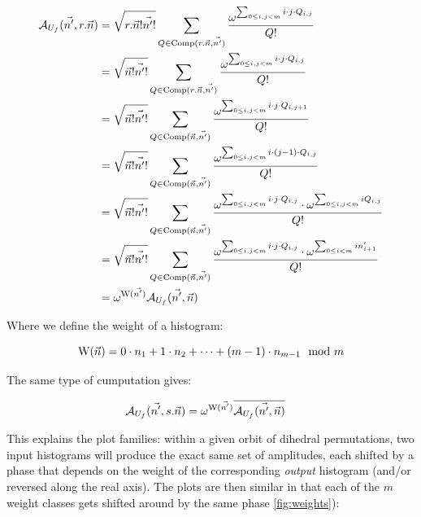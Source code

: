 \begin{align*}
   \mathcal{A}_{U_{f}}(\vec{n'}, r.\vec{n}) &=  \sqrt{r.\vec{n}! \vec{n'}!} \sum_{Q \in \operatorname{Comp}(r.\vec{n}, \vec{n'})} \frac{\omega^{\sum_{0 \leq  i,j < m} i \cdot j \cdot Q_{i,j}}}{Q!}\\
  &= \sqrt{\vec{n}! \vec{n'}!} \sum_{Q \in \operatorname{Comp}(r.\vec{n}, \vec{n'})} \frac{\omega^{\sum_{0 \leq  i,j < m} i \cdot j \cdot Q_{i,j}}}{Q!}\\
  &= \sqrt{\vec{n}! \vec{n'}!} \sum_{Q \in \operatorname{Comp}(\vec{n}, \vec{n'})} \frac{\omega^{\sum_{0 \leq  i,j < m} i \cdot j \cdot Q_{i,j+1}}}{Q!}\\
  &= \sqrt{\vec{n}! \vec{n'}!} \sum_{Q \in \operatorname{Comp}(\vec{n}, \vec{n'})} \frac{\omega^{\sum_{0 \leq  i,j < m} i \cdot (j-1) \cdot Q_{i,j}}}{Q!}\\
  &= \sqrt{\vec{n}! \vec{n'}!} \sum_{Q \in \operatorname{Comp}(\vec{n}, \vec{n'})} \frac{\omega^{\sum_{0 \leq  i,j < m} i \cdot j \cdot Q_{i,j}}\cdot \omega^{\sum_{0 \leq i,j < m} i Q_{i,j}}}{Q!}\\
  &= \sqrt{\vec{n}! \vec{n'}!} \sum_{Q \in \operatorname{Comp}(\vec{n}, \vec{n'})} \frac{\omega^{\sum_{0 \leq  i,j < m} i \cdot j \cdot Q_{i,j}}\cdot \omega^{\sum_{0 \leq i < m} i n'_{i+1}}}{Q!}\\
  &= \omega^{\operatorname{W}(\vec{n'})} \mathcal{A}_{U_{f}}(\vec{n'}, \vec{n})
\end{align*}

Where we define the weight of a histogram:

\[\operatorname{W}(\vec{n}) = 0 \cdot n_{1} + 1 \cdot n_{2} + \cdots + (m-1) \cdot n_{m-1} \mod m \]

The same type of cumputation gives:

\begin{align*}
  \mathcal{A}_{U_{f}}(\vec{n'}, s.\vec{n})   &= \omega^{\operatorname{W}(\vec{n'})} \overline{\mathcal{A}_{U_{f}}(\vec{n'}, \vec{n})}
\end{align*}

This explains the plot families: within a given orbit of dihedral permutations, two input histograms will produce the exact same set of amplitudes, each shifted by a phase that depends on the weight of the corresponding \emph{output} histogram (and/or reversed along the real axis). The plots are then similar in that each of the $m$ weight classes gets shifted around by the same phase \ref{fig:weights}):

